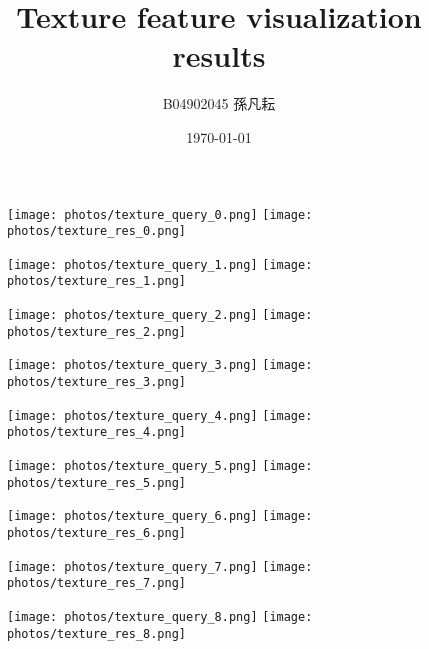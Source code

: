 \documentclass{article}
\begin{document}
\title{Texture feature visualization results}
\author{B04902045 孫凡耘}
\date{\today}
\maketitle

\begin{figure}[!ht]
\centering
\texttt{[image: photos/texture\_query\_0.png]}
\texttt{[image: photos/texture\_res\_0.png]}
\end{figure}

\begin{figure}[!ht]
\centering
\texttt{[image: photos/texture\_query\_1.png]}
\texttt{[image: photos/texture\_res\_1.png]}
\end{figure}

\begin{figure}[!ht]
\centering
\texttt{[image: photos/texture\_query\_2.png]}
\texttt{[image: photos/texture\_res\_2.png]}
\end{figure}

\begin{figure}[!ht]
\centering
\texttt{[image: photos/texture\_query\_3.png]}
\texttt{[image: photos/texture\_res\_3.png]}
\end{figure}

\begin{figure}[!ht]
\centering
\texttt{[image: photos/texture\_query\_4.png]}
\texttt{[image: photos/texture\_res\_4.png]}
\end{figure}

\begin{figure}[!ht]
\centering
\texttt{[image: photos/texture\_query\_5.png]}
\texttt{[image: photos/texture\_res\_5.png]}
\end{figure}

\begin{figure}[!ht]
\centering
\texttt{[image: photos/texture\_query\_6.png]}
\texttt{[image: photos/texture\_res\_6.png]}
\end{figure}

\begin{figure}[!ht]
\centering
\texttt{[image: photos/texture\_query\_7.png]}
\texttt{[image: photos/texture\_res\_7.png]}
\end{figure}

\begin{figure}[!ht]
\centering
\texttt{[image: photos/texture\_query\_8.png]}
\texttt{[image: photos/texture\_res\_8.png]}
\end{figure}
\end{document}
